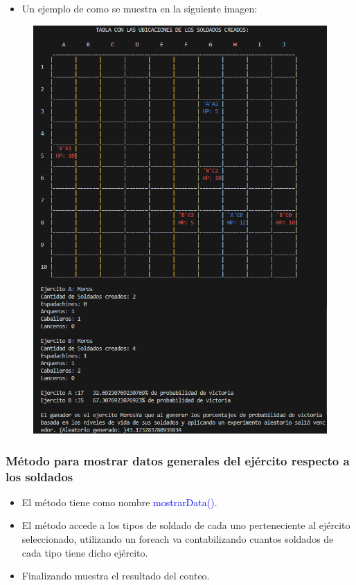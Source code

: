 \documentclass{article}
\begin{document}
\begin{itemize}\begin{itemize}\item Un ejemplo de como se muestra en la siguiente imagen:
\end{itemize}\end{itemize}
\begin{figure}[H]
    \centering
    \includegraphics[width=1\textwidth,keepaspectratio]{img/showArmyTable.png}
    \caption{}
\end{figure}


\subsubsection{Método para mostrar datos generales del ejército respecto a los soldados}
\begin{itemize}
    \item El método tiene como nombre \textcolor{blue}{mostrarData()}.
    \item El método accede a los tipos de soldado de cada uno perteneciente al ejército seleccionado, utilizando un foreach va contabilizando cuantos soldados de cada tipo tiene dicho ejército.
    \item Finalizando muestra el resultado del conteo.
\end{itemize}

\end{document}
